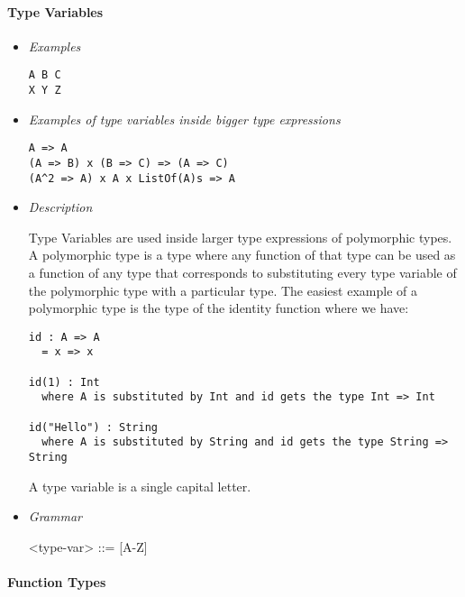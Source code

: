 \documentclass{article}
\begin{document}
\paragraph{Type Variables}

\begin{itemize}
\item \textit{Examples}
\begin{verbatim}
A B C
X Y Z
\end{verbatim}

\item \textit{Examples of type variables inside bigger type expressions}
\begin{verbatim}
A => A
(A => B) x (B => C) => (A => C)
(A^2 => A) x A x ListOf(A)s => A
\end{verbatim}

\item \textit{Description}

Type Variables are used inside larger type expressions of polymorphic types. A
polymorphic type is a type where any function of that type can be used as a
function of any type that corresponds to substituting every type variable of
the polymorphic type with a particular type. The easiest example of a
polymorphic type is the type of the identity function where we have:
\begin{verbatim}
id : A => A
  = x => x

id(1) : Int
  where A is substituted by Int and id gets the type Int => Int

id("Hello") : String
  where A is substituted by String and id gets the type String => String
\end{verbatim}

A type variable is a single capital letter.

\item \textit{Grammar}
\begin{grammar}
<type-var> ::= [A-Z] \\ 
\end{grammar}
\end{itemize}

\paragraph{Function Types}
\end{document}
